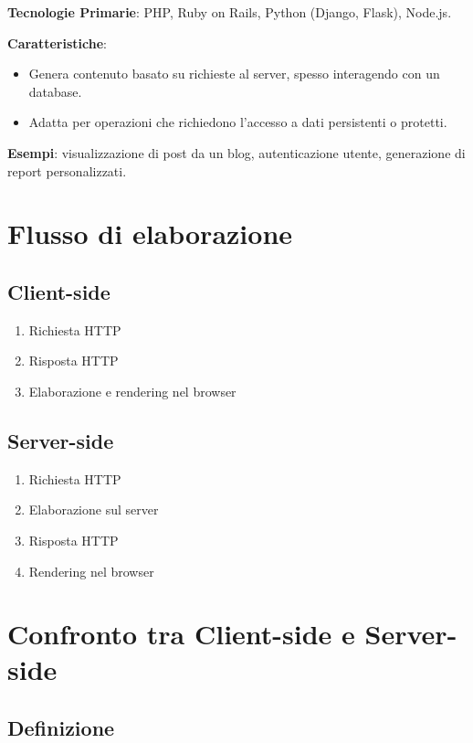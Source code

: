 \textbf{Tecnologie Primarie}: PHP, Ruby on Rails, Python (Django, Flask), Node.js.

\textbf{Caratteristiche}:
\begin{itemize}
    \item Genera contenuto basato su richieste al server, spesso interagendo con un database.
    \item Adatta per operazioni che richiedono l'accesso a dati persistenti o protetti.
\end{itemize}

\textbf{Esempi}: visualizzazione di post da un blog, autenticazione utente, generazione di report personalizzati.

\section{Flusso di elaborazione}

\subsection{Client-side}

\begin{enumerate}
    \item Richiesta HTTP
    \item Risposta HTTP
    \item Elaborazione e rendering nel browser
\end{enumerate}

\subsection{Server-side}

\begin{enumerate}
    \item Richiesta HTTP
    \item Elaborazione sul server
    \item Risposta HTTP
    \item Rendering nel browser
\end{enumerate}

\section{Confronto tra Client-side e Server-side}

\subsection{Definizione}

